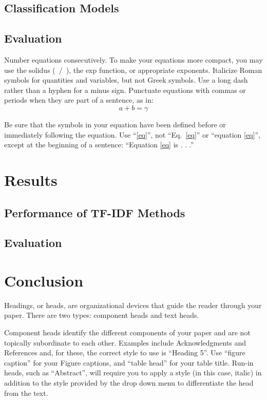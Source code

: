 \documentclass[conference]{IEEEtran}
\begin{document}
\subsection{Classification Models}\label{AA}

\subsection{Evaluation}\label{AA}

Number equations consecutively. To make your 
equations more compact, you may use the solidus (~/~), the exp function, or 
appropriate exponents. Italicize Roman symbols for quantities and variables, 
but not Greek symbols. Use a long dash rather than a hyphen for a minus 
sign. Punctuate equations with commas or periods when they are part of a 
sentence, as in:
\begin{equation}
a+b=\gamma\label{eq}
\end{equation}

Be sure that the 
symbols in your equation have been defined before or immediately following 
the equation. Use ``\eqref{eq}'', not ``Eq.~\eqref{eq}'' or ``equation \eqref{eq}'', except at 
the beginning of a sentence: ``Equation \eqref{eq} is . . .''

\section{Results}
\subsection{Performance of TF-IDF Methods}\label{AA}
\subsection{Evaluation}\label{AA}


\section{Conclusion}
Headings, or heads, are organizational devices that guide the reader through 
your paper. There are two types: component heads and text heads.

Component heads identify the different components of your paper and are not 
topically subordinate to each other. Examples include Acknowledgments and 
References and, for these, the correct style to use is ``Heading 5''. Use 
``figure caption'' for your Figure captions, and ``table head'' for your 
table title. Run-in heads, such as ``Abstract'', will require you to apply a 
style (in this case, italic) in addition to the style provided by the drop 
down menu to differentiate the head from the text.
\end{document}
